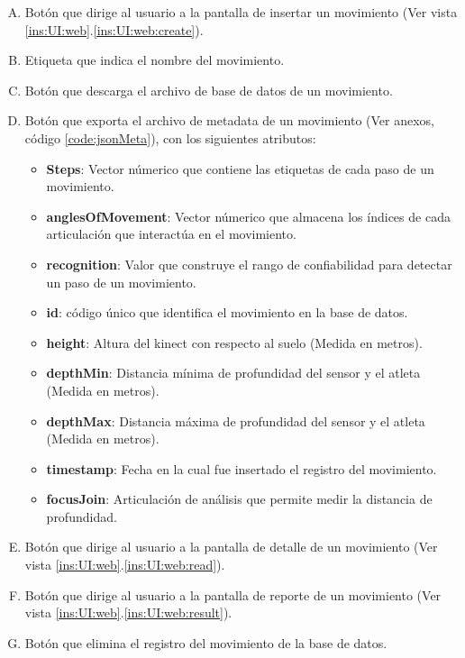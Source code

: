 \begin{enumerate}[A.]
\item Bot\'on que dirige al usuario a la pantalla de insertar un movimiento (Ver vista \ref{ins:UI:web}.\ref{ins:UI:web:create}).
\item Etiqueta que indica el nombre del movimiento.
\item Bot\'on que descarga el archivo de base de datos de un movimiento.
\item Bot\'on que exporta el archivo de metadata de un movimiento (Ver anexos, c\'odigo \ref{code:jsonMeta}), con los siguientes atributos:
	\begin{itemize}
	\item \textbf{Steps}: Vector n\'umerico que contiene las etiquetas de cada paso de un movimiento.
	\item \textbf{anglesOfMovement}: Vector n\'umerico que almacena los \'indices de cada articulaci\'on que interact\'ua en el movimiento.
	\item \textbf{recognition}: Valor que construye  el rango de confiabilidad para detectar un paso de un movimiento.
	\item \textbf{id}: c\'odigo \'unico que identifica el movimiento en la base de datos.
	\item \textbf{height}: Altura del kinect con respecto al suelo (Medida en metros).	
	\item \textbf{depthMin}: Distancia m\'inima de profundidad del sensor y el atleta (Medida en metros).
	\item \textbf{depthMax}: Distancia m\'axima de profundidad del sensor y el atleta (Medida en metros).
	\item \textbf{timestamp}: Fecha en la cual fue insertado el registro del movimiento.
	\item \textbf{focusJoin}: Articulaci\'on de an\'alisis que permite medir la distancia de profundidad. 
	\end{itemize}
\item Bot\'on que dirige al usuario a la pantalla de detalle de un movimiento (Ver vista \ref{ins:UI:web}.\ref{ins:UI:web:read}).
\item Bot\'on que dirige al usuario a la pantalla de reporte de un movimiento (Ver vista \ref{ins:UI:web}.\ref{ins:UI:web:result}).
\item Bot\'on que elimina el registro del movimiento de la base de datos.
\end{enumerate}

